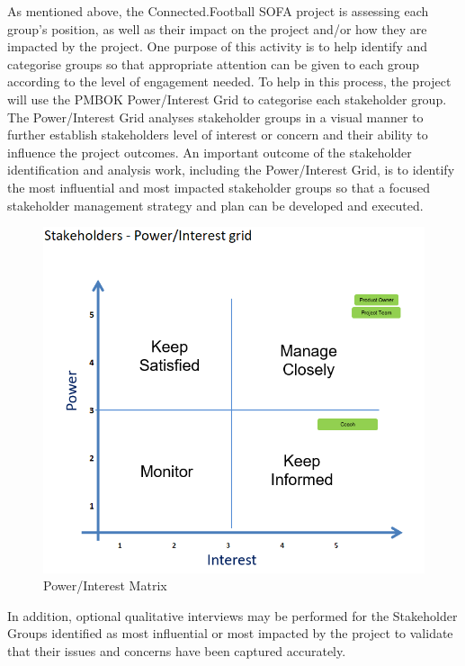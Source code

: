 As mentioned above, the Connected.Football SOFA project is assessing each group’s position, as well as their impact on the project and/or how they are impacted by the project.  One purpose of this activity is to help identify and categorise groups so that appropriate attention can be given to each group according to the level of engagement needed.  To help in this process, the project will use the PMBOK Power/Interest Grid to categorise each stakeholder group.  The Power/Interest Grid analyses stakeholder groups in a visual manner to further establish stakeholders level of interest or concern and their ability to influence the project outcomes. 
\newline
An important outcome of the stakeholder identification and analysis work, including the Power/Interest Grid, is to identify the most influential and most impacted stakeholder groups so that a focused stakeholder management strategy and plan can be developed and executed.

\begin{figure}[H]
  \includegraphics[width=\linewidth]{content/diagram/stakeholder/power_interest.png}
  \caption{Power/Interest Matrix}
\end{figure}

In addition, optional qualitative interviews may be performed for the Stakeholder Groups identified as most influential or most impacted by the project to validate that their issues and concerns have been captured accurately.

